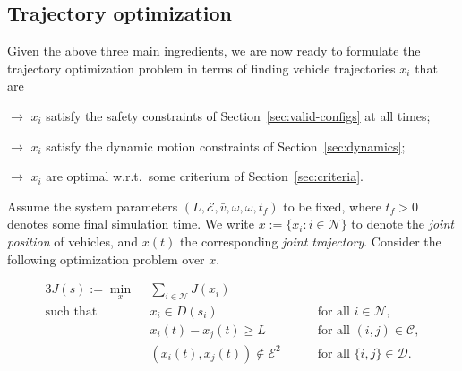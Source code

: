 \documentclass[a4paper]{report}
\theoremstyle{definition}
\theoremstyle{plain}
\begin{document}
\subsection{Trajectory optimization}\label{sec:motion-planning}

Given the above three main ingredients, we are now ready to formulate the
trajectory optimization problem in terms of finding vehicle trajectories $x_i$
that are
\begin{samepage}
\begin{description}[leftmargin=\parindent,labelindent=\parindent,labelwidth=\widthof{\bfseries collision-free }]
  \item[safe] $\rightarrow$ $x_i$ satisfy the safety constraints of
        Section~\ref{sec:valid-configs} at all times;
  \item[admissible] $\rightarrow$ $x_i$ satisfy the dynamic motion constraints of
        Section~\ref{sec:dynamics};
  \item[efficient] $\rightarrow$ $x_i$ are optimal w.r.t.\ some criterium of
        Section~\ref{sec:criteria}.
\end{description}
\end{samepage}
%
Assume the system parameters
$(L,\mathcal{E}, \bar{v}, \omega, \bar{\omega}, t_{f})$ to be fixed, where
$t_f > 0$ denotes some final simulation time.
%
We write $x := \{ x_{i} : i \in \mathcal{N} \}$ to denote the \emph{joint position}
of vehicles, and $x(t)$ the corresponding \emph{joint trajectory}. Consider the
following optimization problem over $x$.

\begin{mdframed}
\vspace{-\abovedisplayskip}
\begin{alignat}{3}\label{eq:T}
  J(s) := \min_{x} \;\, & \sum_{i \in \mathcal{N}} J(x_{i}) \tag{T} \\
  \text{such that } \; & x_{i} \in D(s_{i}) && \quad \text{ for all } i \in \mathcal{N} , \tag{T.1} \label{eq:T1} \\
           & x_{i}(t) - x_{j}(t) \geq L && \quad \text{ for all } (i,j) \in \mathcal{C} , \tag{T.2} \label{eq:T2}\\
           & (x_{i}(t), x_{j}(t)) \notin \mathcal{E}^{2} && \quad\text{ for all } \{i, j\} \in \mathcal{D} . \tag{T.3} \label{eq:T3}
\end{alignat}
\end{mdframed}
\end{document}
